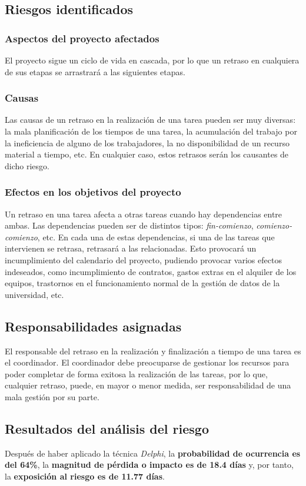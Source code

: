 \documentclass[11pt,a4paper,spanish,twoside]{book}
\begin{document}
\subsection{Riesgos identificados}
\subsubsection{Aspectos del proyecto afectados}
El proyecto sigue un ciclo de vida en cascada, por lo que un retraso en 
cualquiera de sus etapas se arrastrará a las siguientes etapas.

\subsubsection{Causas}
Las causas de un retraso en la realización de una tarea pueden ser muy
diversas: la mala planificación de los tiempos de una tarea, la acumulación del trabajo por la ineficiencia de alguno de los trabajadores, la no disponibilidad
de un recurso material a tiempo, etc. En cualquier caso, estos retrasos serán
los causantes de dicho riesgo.

\subsubsection{Efectos en los objetivos del proyecto}
Un retraso en una tarea afecta a otras tareas cuando hay dependencias entre
ambas. Las dependencias pueden ser de distintos tipos: \emph{fin-comienzo}, 
\emph{comienzo-comienzo}, etc. En cada una de estas dependencias, si una de
las tareas 
que intervienen se retrasa, retrasará a las relacionadas. Esto provocará un
incumplimiento del calendario del proyecto, pudiendo provocar varios efectos
indeseados, como incumplimiento de contratos, gastos extras en el alquiler de
los equipos, trastornos en el funcionamiento normal de la gestión de datos de
la universidad, etc.

\subsection{Responsabilidades asignadas}
El responsable del retraso en la realización y finalización a tiempo de una
tarea es el coordinador. El coordinador debe preocuparse de gestionar los
recursos para poder completar de forma exitosa la realización de las
tareas, por lo que, cualquier retraso, puede, en mayor o menor medida, ser
responsabilidad de una mala gestión por su parte.

\subsection{Resultados del análisis del riesgo}
Después de haber aplicado la técnica \emph{Delphi}, la \textbf{probabilidad de
ocurrencia es del 64\%}, la \textbf{magnitud de pérdida o impacto es de 18.4
días } y, por tanto, la \textbf{exposición al riesgo es de 11.77 días}.
\end{document}
